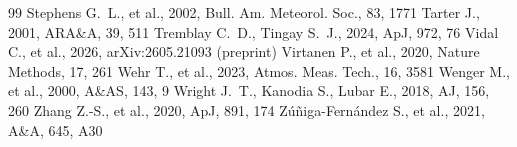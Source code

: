 \documentclass[twocolumn,twocolappendix,numberedappendix,appendixfloats]{openjournal}
\begin{document}
\begin{thebibliography}{99}
 Stephens G.~L., et al., 2002, Bull. Am. Meteorol. Soc., 83, 1771
 Tarter J., 2001, ARA\&A, 39, 511
 Tremblay C.~D., Tingay S.~J., 2024, ApJ, 972, 76
 Vidal C., et al., 2026, arXiv:2605.21093 (preprint)
 Virtanen P., et al., 2020, Nature Methods, 17, 261
 Wehr T., et al., 2023, Atmos. Meas. Tech., 16, 3581
 Wenger M., et al., 2000, A\&AS, 143, 9
 Wright J.~T., Kanodia S., Lubar E., 2018, AJ, 156, 260
 Zhang Z.-S., et al., 2020, ApJ, 891, 174
 Z\'u\~niga-Fern\'andez S., et al., 2021, A\&A, 645, A30
\end{thebibliography}
\end{document}
